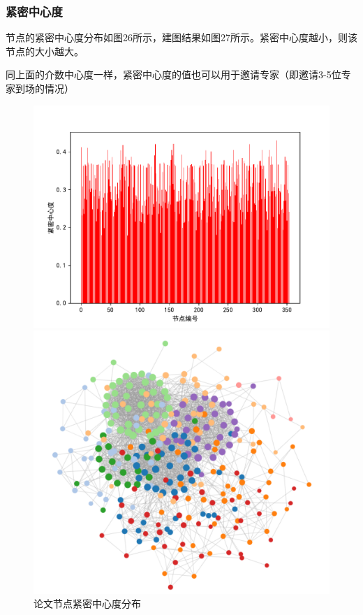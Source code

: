 \documentclass[UTF8, onecolumn, a4paper]{article}
\begin{document}
\subsubsection{紧密中心度}
    节点的紧密中心度分布如图26所示，建图结果如图27所示。紧密中心度越小，则该节点的大小越大。
    
    同上面的介数中心度一样，紧密中心度的值也可以用于邀请专家（即邀请3-5位专家到场的情况）
\begin{center}
	\begin{figure}[ht] %
		\centering %
		\begin{minipage}[b]{0.95\linewidth} %
			\begin{minipage}[b]{0.47\linewidth} %
				\centering
				\includegraphics[width=\linewidth]{../pictures/paper_closeness}
				\caption{论文节点紧密中心度分布}
			\end{minipage}
			\hfill
			\begin{minipage}[b]{0.46\linewidth}
				\centering
				\includegraphics[width=\linewidth]{../pictures/show20}

\end{minipage}
\end{minipage}
\end{figure}
\end{center}
\end{document}
